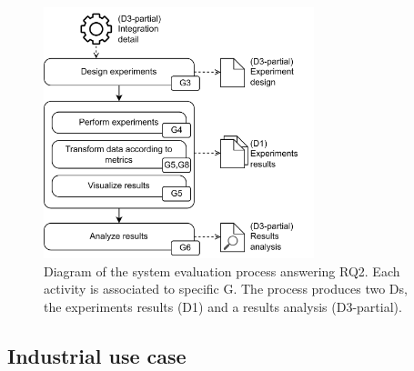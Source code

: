 \begin{figure}[!ht]
    \begin{center}
    \includegraphics[width=0.7\textwidth]{figures/3-method/method_exp.png}
    \caption[System evaluation process - Legacy vs. IcedHops]{Diagram of the system evaluation process answering \gls{RQ}2. Each activity is associated to specific \gls{G}. The process produces two \glspl{D}, the experiments results (\gls{D}1) and a results analysis (\gls{D}3-partial).}
    \label{fig:method_experiments}
    \end{center}
\end{figure}


\subsection{Industrial use case}
\label{subsec:method_use_case}

